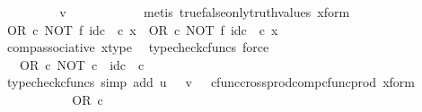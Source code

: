 \begin{isabellebody}
\ \ \ \ \ \ \isamarkupfalse%
\ \isamarkupfalse%
\ {\isachardoublequoteopen}v\ {\isacharequal}{\kern0pt}\ {\isasymf}{\isachardoublequoteclose}\isanewline
\ \ \ \ \ \ \ \ \isamarkupfalse%
\ {\isacharparenleft}{\kern0pt}metis\ true{\isacharunderscore}{\kern0pt}false{\isacharunderscore}{\kern0pt}only{\isacharunderscore}{\kern0pt}truth{\isacharunderscore}{\kern0pt}values\ x{\isacharunderscore}{\kern0pt}form{\isacharparenright}{\kern0pt}\isanewline
\ \ \ \ \ \ \isamarkupfalse%
\ {\isachardoublequoteopen}{\isacharparenleft}{\kern0pt}OR\ {\isasymcirc}\isactrlsub c\ NOT\ {\isasymtimes}\isactrlsub f\ id\isactrlsub c\ {\isasymOmega}{\isacharparenright}{\kern0pt}\ {\isasymcirc}\isactrlsub c\ x\ {\isacharequal}{\kern0pt}\ OR\ {\isasymcirc}\isactrlsub c\ {\isacharparenleft}{\kern0pt}NOT\ {\isasymtimes}\isactrlsub f\ id\isactrlsub c\ {\isasymOmega}{\isacharparenright}{\kern0pt}\ {\isasymcirc}\isactrlsub c\ x{\isachardoublequoteclose}\isanewline
\ \ \ \ \ \ \ \ \isamarkupfalse%
\ comp{\isacharunderscore}{\kern0pt}associative{}\ x{\isacharunderscore}{\kern0pt}type\ \isamarkupfalse%
\ {\isacharparenleft}{\kern0pt}typecheck{\isacharunderscore}{\kern0pt}cfuncs{\isacharcomma}{\kern0pt}\ force{\isacharparenright}{\kern0pt}\isanewline
\ \ \ \ \ \ \isamarkupfalse%
\ \isamarkupfalse%
\ {\isachardoublequoteopen}{\isachardot}{\kern0pt}{\isachardot}{\kern0pt}{\isachardot}{\kern0pt}\ {\isacharequal}{\kern0pt}\ OR\ {\isasymcirc}\isactrlsub c\ {\isasymlangle}NOT\ {\isasymcirc}\isactrlsub c\ {\isasymt}{\isacharcomma}{\kern0pt}\ id\isactrlsub c\ {\isasymOmega}\ {\isasymcirc}\isactrlsub c\ {\isasymf}{\isasymrangle}{\isachardoublequoteclose}\isanewline
\ \ \ \ \ \ \ \ \isamarkupfalse%
\ {\isacharparenleft}{\kern0pt}typecheck{\isacharunderscore}{\kern0pt}cfuncs{\isacharcomma}{\kern0pt}\ simp\ add{\isacharcolon}{\kern0pt}\ {\isacartoucheopen}u\ {\isacharequal}{\kern0pt}\ {\isasymt}{\isacartoucheclose}\ {\isacartoucheopen}v\ {\isacharequal}{\kern0pt}\ {\isasymf}{\isacartoucheclose}\ cfunc{\isacharunderscore}{\kern0pt}cross{\isacharunderscore}{\kern0pt}prod{\isacharunderscore}{\kern0pt}comp{\isacharunderscore}{\kern0pt}cfunc{\isacharunderscore}{\kern0pt}prod\ x{\isacharunderscore}{\kern0pt}form{\isacharparenright}{\kern0pt}\isanewline
\ \ \ \ \ \ \isamarkupfalse%
\ \isamarkupfalse%
\ {\isachardoublequoteopen}{\isachardot}{\kern0pt}{\isachardot}{\kern0pt}{\isachardot}{\kern0pt}\ {\isacharequal}{\kern0pt}\ OR\ {\isasymcirc}\isactrlsub c\ {\isasymlangle}{\isasymf}{\isacharcomma}{\kern0pt}\ {\isasymf}{\isasymrangle}{\isachardoublequoteclose}\isanewline

\end{isabellebody}
